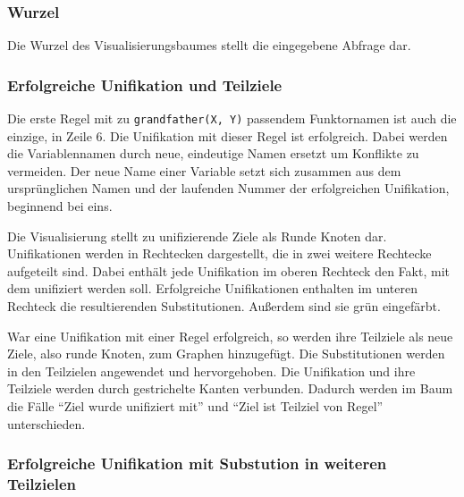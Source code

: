 \documentclass[parskip=full,11pt,twoside]{scrartcl}
\begin{document}
\subsubsection{Wurzel}

\begin{minipage}{\linewidth}
\end{minipage}

Die Wurzel des Visualisierungsbaumes stellt die eingegebene Abfrage dar.

\subsubsection{Erfolgreiche Unifikation und Teilziele}

Die erste Regel mit zu \texttt{grandfather(X, Y)} passendem Funktornamen ist auch die einzige, in Zeile 6.
Die Unifikation mit dieser Regel ist erfolgreich.
Dabei werden die Variablennamen durch neue, eindeutige Namen ersetzt um Konflikte zu vermeiden.
Der neue Name einer Variable setzt sich zusammen aus dem ursprünglichen Namen und der laufenden Nummer der erfolgreichen Unifikation, beginnend bei eins.

\begin{minipage}{\linewidth}
\end{minipage}

Die Visualisierung stellt zu unifizierende Ziele als Runde Knoten dar.
Unifikationen werden in  Rechtecken dargestellt, die in zwei weitere Rechtecke aufgeteilt sind.
Dabei enthält jede Unifikation im oberen Rechteck den Fakt, mit dem unifiziert werden soll.
Erfolgreiche Unifikationen enthalten im unteren Rechteck die resultierenden Substitutionen.
Außerdem sind sie grün eingefärbt.

War eine Unifikation mit einer Regel erfolgreich, so werden ihre Teilziele als neue Ziele, also runde Knoten, zum Graphen hinzugefügt.
Die Substitutionen werden in den Teilzielen angewendet und hervorgehoben.
Die Unifikation und ihre Teilziele werden durch gestrichelte Kanten verbunden.
Dadurch werden im Baum die Fälle \enquote{Ziel wurde unifiziert mit} und \enquote{Ziel ist Teilziel von Regel} unterschieden.

\subsubsection{Erfolgreiche Unifikation mit Substution in weiteren Teilzielen}
\end{document}
